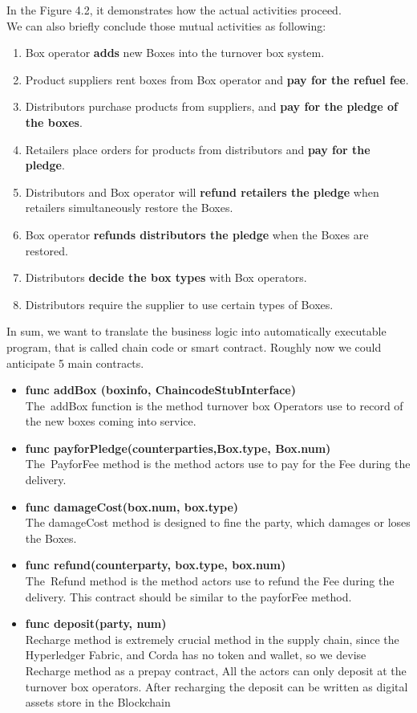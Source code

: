 In the Figure 4.2, it demonstrates how the actual activities proceed.\\
We can also briefly conclude those mutual activities as following:
\begin{enumerate}
	\item Box operator \textbf{adds} new Boxes into the turnover box system.
	\item Product suppliers rent boxes from Box operator and \textbf{pay for the refuel fee}.
	\item Distributors purchase products from suppliers, and \textbf{pay for the pledge of the boxes}.
	\item Retailers place orders for products from distributors and \textbf{pay for the pledge}.
	\item Distributors and Box operator will \textbf{refund retailers the pledge} when retailers simultaneously restore the Boxes.
	\item Box operator \textbf{refunds distributors the pledge} when the Boxes are restored.
	\item Distributors \textbf{decide the box types} with Box operators. 
	\item Distributors require the supplier to use certain types of Boxes.	
\end{enumerate}
In sum, we want to translate the business logic into automatically executable program, that is called chain code or smart contract. Roughly now we could anticipate 5 main contracts.
\begin{itemize}
	\item \textbf{func addBox (boxinfo, ChaincodeStubInterface)}\\
		  The addBox function is the method turnover box Operators use to record of the new boxes coming into service. 
		  
	\item \textbf{func payforPledge(counterparties,Box.type, Box.num)}\\
	      The PayforFee method is the method actors use to pay for the Fee during the delivery.
	      
	\item \textbf{func damageCost(box.num, box.type)}\\
	      The damageCost method is designed to fine the party, which damages or loses the Boxes.
	      
	\item \textbf{func refund(counterparty, box.type, box.num)}\\
	      The Refund method is the method actors use to refund the Fee during the delivery. This contract should be similar to the payforFee method.
	      
	\item \textbf{func deposit(party, num)}\\
	      Recharge method is extremely crucial method in the supply chain, since the Hyperledger Fabric, and Corda has no token and wallet, so we devise Recharge method as a prepay contract, 
	      All the actors can only deposit at the turnover box operators. After recharging the deposit
	      can be written as digital assets store in the Blockchain
\end{itemize}


